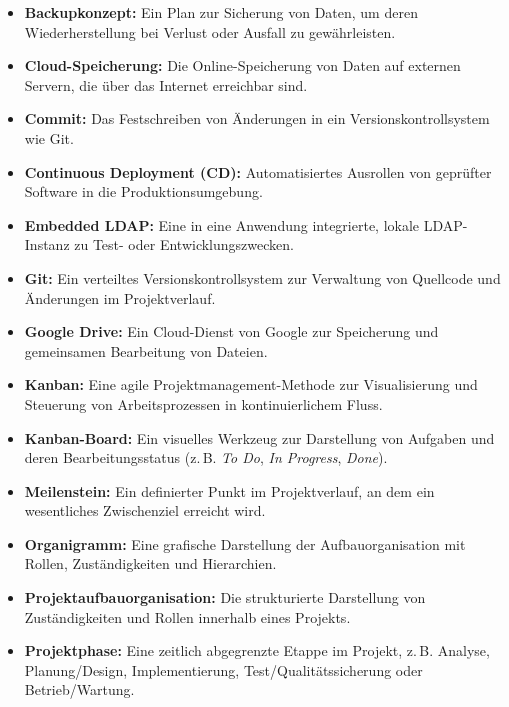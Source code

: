 \begin{itemize}
  \item \textbf{Backupkonzept:} Ein Plan zur Sicherung von Daten, um deren Wiederherstellung bei Verlust oder Ausfall zu gewährleisten.

  \item \textbf{Cloud-Speicherung:} Die Online-Speicherung von Daten auf externen Servern, die über das Internet erreichbar sind.

  \item \textbf{Commit:} Das Festschreiben von Änderungen in ein Versionskontrollsystem wie Git.

  \item \textbf{Continuous Deployment (CD):} Automatisiertes Ausrollen von geprüfter Software in die Produktionsumgebung.

  \item \textbf{Embedded LDAP:} Eine in eine Anwendung integrierte, lokale LDAP-Instanz zu Test- oder Entwicklungszwecken.

  \item \textbf{Git:} Ein verteiltes Versionskontrollsystem zur Verwaltung von Quellcode und Änderungen im Projektverlauf.

  \item \textbf{Google Drive:} Ein Cloud-Dienst von Google zur Speicherung und gemeinsamen Bearbeitung von Dateien.

  \item \textbf{Kanban:} Eine agile Projektmanagement-Methode zur Visualisierung und Steuerung von Arbeitsprozessen in kontinuierlichem Fluss.

  \item \textbf{Kanban-Board:} Ein visuelles Werkzeug zur Darstellung von Aufgaben und deren Bearbeitungsstatus (z.\,B. \textit{To Do}, \textit{In Progress}, \textit{Done}).

  \item \textbf{Meilenstein:} Ein definierter Punkt im Projektverlauf, an dem ein wesentliches Zwischenziel erreicht wird.

  \item \textbf{Organigramm:} Eine grafische Darstellung der Aufbauorganisation mit Rollen, Zuständigkeiten und Hierarchien.

  \item \textbf{Projektaufbauorganisation:} Die strukturierte Darstellung von Zuständigkeiten und Rollen innerhalb eines Projekts.

  \item \textbf{Projektphase:} Eine zeitlich abgegrenzte Etappe im Projekt, z.\,B. Analyse, Planung/Design, Implementierung, Test/Qualitätssicherung oder Betrieb/Wartung.


\end{itemize}
